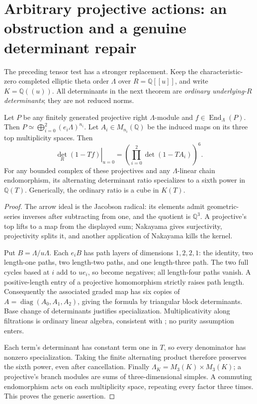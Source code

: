 \section{Arbitrary projective actions: an obstruction and a genuine determinant repair}
The preceding tensor test has a stronger replacement. Keep the characteristic-zero completed elliptic theta order $\Lambda$ over $R=\mathbb Q[[u]]$, and write $K=\mathbb Q((u))$. All determinants in the next theorem are \emph{ordinary underlying-$R$ determinants}; they are not reduced norms.
\begin{theorem}\label{thm:theta-multiplicity}
Let $P$ be any finitely generated projective right $\Lambda$-module and $f\in\operatorname{End}_\Lambda(P)$. Then $P\simeq\bigoplus_{i=0}^2(e_i\Lambda)^{n_i}$. Let $A_i\in M_{n_i}(\mathbb Q)$ be the induced maps on its three top multiplicity spaces. Then
\[
 \left.\det_R(1-Tf)\right|_{u=0}
 =\left(\prod_{i=0}^2\det(1-TA_i)\right)^6.
\]
For any bounded complex of these projectives and any $\Lambda$-linear chain endomorphism, its alternating determinant ratio specializes to a sixth power in $\mathbb Q(T)$. Generically, the ordinary ratio is a cube in $K(T)$.
\end{theorem}
\begin{proof}
The arrow ideal is the Jacobson radical: its elements admit geometric-series inverses after subtracting from one, and the quotient is $\mathbb Q^3$. A projective's top lifts to a map from the displayed sum; Nakayama gives surjectivity, projectivity splits it, and another application of Nakayama kills the kernel.

Put $B=\Lambda/u\Lambda$. Each $e_iB$ has path layers of dimensions $1,2,2,1$: the identity, two length-one paths, two length-two paths, and one length-three path. The two full cycles based at $i$ add to $ue_i$, so become negatives; all length-four paths vanish. A positive-length entry of a projective homomorphism strictly raises path length. Consequently the associated graded map has six copies of $A=\operatorname{diag}(A_0,A_1,A_2)$, giving the formula by triangular block determinants. Base change of determinants justifies specialization. Multiplicativity along filtrations is ordinary linear algebra, consistent with \cite[Tags0FJ9,0GSX]{StacksDeterminants}; no purity assumption enters.

Each term's determinant has constant term one in $T$, so every denominator has nonzero specialization. Taking the finite alternating product therefore preserves the sixth power, even after cancellation. Finally $\Lambda_K=M_3(K)\times M_3(K)$; a projective's branch modules are sums of three-dimensional simples. A commuting endomorphism acts on each multiplicity space, repeating every factor three times. This proves the generic assertion.
\end{proof}
